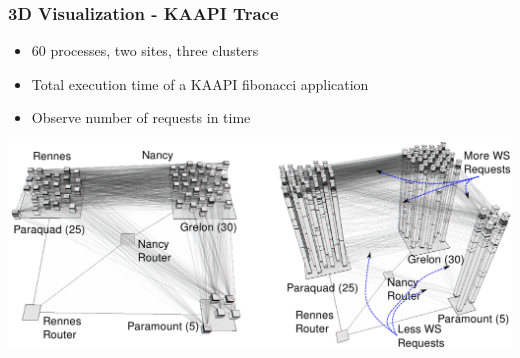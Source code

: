 \frame
{
   \frametitle{3D Visualization - KAAPI Trace}
   \begin{itemize}
   \item 60 processes, two sites, three clusters
   \item Total execution time of a KAAPI fibonacci application
   \item Observe number of requests in time
   \end{itemize}

   \vfill
   \hspace{-1cm}
   \begin{minipage}{\textwidth}
   \includegraphics[width=1.15\textwidth]{img/scenario-3d-A.pdf}
   \end{minipage}
}


%


